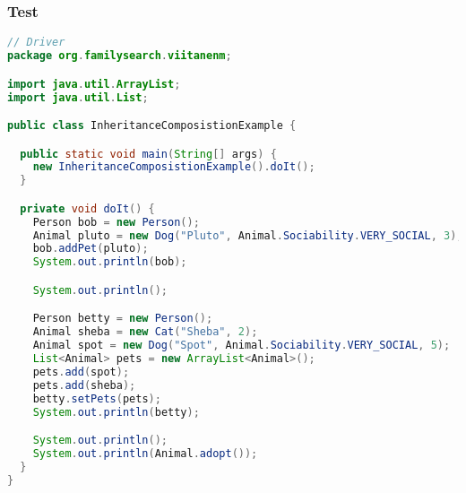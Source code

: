 \subsubsection{Test}\label{App:AppendixJTest}
\begin{lstlisting}[language=Java]
// Driver
package org.familysearch.viitanenm;

import java.util.ArrayList;
import java.util.List;

public class InheritanceComposistionExample {

  public static void main(String[] args) {
    new InheritanceComposistionExample().doIt();
  }

  private void doIt() {
    Person bob = new Person();
    Animal pluto = new Dog("Pluto", Animal.Sociability.VERY_SOCIAL, 3);
    bob.addPet(pluto);
    System.out.println(bob);

    System.out.println();

    Person betty = new Person();
    Animal sheba = new Cat("Sheba", 2);
    Animal spot = new Dog("Spot", Animal.Sociability.VERY_SOCIAL, 5);
    List<Animal> pets = new ArrayList<Animal>();
    pets.add(spot);
    pets.add(sheba);
    betty.setPets(pets);
    System.out.println(betty);

    System.out.println();
    System.out.println(Animal.adopt());
  }
}


\end{lstlisting}